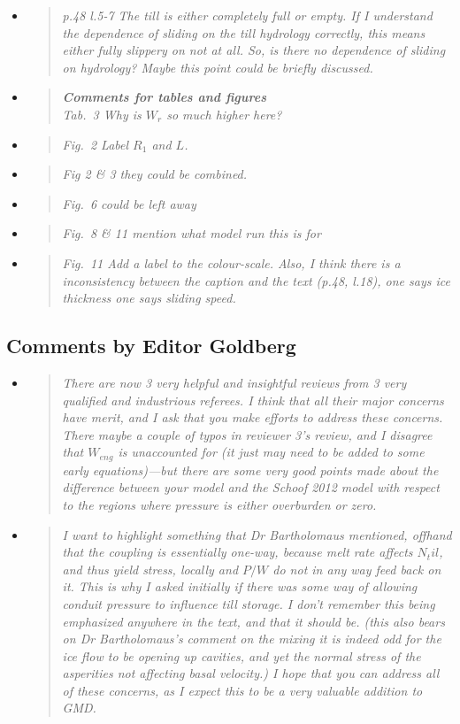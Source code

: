 \documentclass[11pt,reqno]{amsart}
\newcommand{\reply}[2]{
\medskip\medskip
\item  \begin{quote}
\emph{#1}
\end{quote}

\medskip
\noindent #2}
\begin{document}
\begin{itemize}
\reply{p.48 l.5-7 The till is either completely full or empty.  If I understand the dependence of sliding on the till hydrology correctly, this means either fully slippery on not at all.
So, is there no dependence of sliding on hydrology?  Maybe this point could be
briefly discussed.}
{}

\reply{\textbf{Comments for tables and figures}\\
Tab.~3 Why is $W_r$ so much higher here?}
{}

\reply{Fig.~2 Label $R_1$ and $L$.}
{}

\reply{Fig 2 \& 3 they could be combined.}
{}

\reply{Fig.~6 could be left away}
{}

\reply{Fig.~8 \& 11 mention what model run this is for}
{}

\reply{Fig.~11 Add a label to the colour-scale. Also, I think there is a inconsistency between
the caption and the text (p.48, l.18), one says ice thickness one says sliding
speed.}
{}
\end{itemize}



\subsection*{Comments by Editor Goldberg}\begin{itemize}
\reply{There are now 3 very helpful and insightful reviews from 3 very qualified and industrious
referees. I think that all their major concerns have merit, and I ask that you make efforts
to address these concerns. There maybe a couple of typos in reviewer 3's review, and
I disagree that $W_{eng}$ is unaccounted for (it just may need to be added to some early
equations)---but there are some very good points made about the difference between
your model and the Schoof 2012 model with respect to the regions where pressure is
either overburden or zero.}
{}

\reply{I want to highlight something that Dr Bartholomaus mentioned, offhand that the coupling is essentially one-way, because melt rate affects $N_til$, and thus yield stress, locally and $P/W$ do not in any way feed back on it. This is why I asked initially if there was
some way of allowing conduit pressure to influence till storage. I don't remember this
being emphasized anywhere in the text, and that it should be. (this also bears on Dr
Bartholomaus's comment on the mixing it is indeed odd for the ice flow to be opening
up cavities, and yet the normal stress of the asperities not affecting basal velocity.)
I hope that you can address all of these concerns, as I expect this to be a very valuable
addition to GMD.}
{}

\end{itemize}
\end{document}
